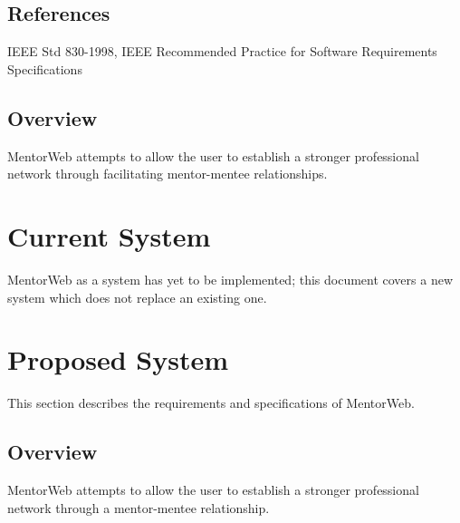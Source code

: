 \documentclass[11pt]{article}
\begin{document}
    \subsection{References}
        IEEE Std 830-1998, IEEE Recommended Practice for Software Requirements
        Specifications

    \subsection{Overview}
        MentorWeb attempts to allow the user to establish a
        stronger professional network through facilitating
        mentor-mentee relationships.

\section{Current System}
    MentorWeb as a system has yet to be implemented; this
    document covers a new system which does not replace an existing one.

\section{Proposed System}
    This section describes the requirements and specifications of
    MentorWeb.

    \subsection{Overview}
        MentorWeb attempts to allow the user to establish a
        stronger professional network through a
        mentor-mentee relationship.
\end{document}
